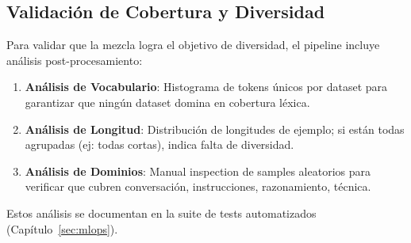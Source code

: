 \subsection{Validación de Cobertura y Diversidad}

Para validar que la mezcla logra el objetivo de diversidad, el pipeline incluye análisis post-procesamiento:

\begin{enumerate}
    \item \textbf{Análisis de Vocabulario}: Histograma de tokens únicos por dataset para garantizar que ningún dataset domina en cobertura léxica.
    \item \textbf{Análisis de Longitud}: Distribución de longitudes de ejemplo; si están todas agrupadas (ej: todas cortas), indica falta de diversidad.
    \item \textbf{Análisis de Dominios}: Manual inspection de samples aleatorios para verificar que cubren conversación, instrucciones, razonamiento, técnica.
\end{enumerate}

Estos análisis se documentan en la suite de tests automatizados (Capítulo~\ref{sec:mlops}).

